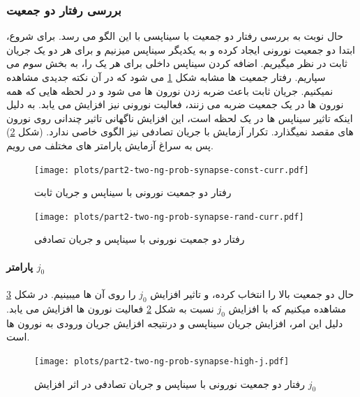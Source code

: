         \subsubsection*{بررسی رفتار دو جمعیت}
            حال نوبت به بررسی رفتار دو جمعیت با سیناپسی با این الگو می رسد. برای شروع، ابتدا دو جمعیت نورونی ایجاد کرده و به یکدیگر سیناپس میزنیم و برای هر دو یک جریان ثابت در نظر میگیریم. اضافه کردن سیناپس داخلی برای هر یک را، به بخش سوم می سپاریم. رفتار جمعیت ها مشابه شکل 
            \ref{fig:part2-two-ng-prob-synapse-const-curr}
            می شود که در آن نکته جدیدی مشاهده نمیکنیم. جریان ثابت باعث ضربه زدن نورون ها می شود و در لحظه هایی که همه نورون ها در یک جمعیت ضربه می زنند، فعالیت نورونی نیز افزایش می یابد. به دلیل اینکه تاثیر سیناپس ها در یک لحظه است، این افزایش ناگهانی تاثیر چندانی روی نورون های مقصد نمیگذارد. تکرار آزمایش با جریان تصادفی نیز الگوی خاصی ندارد.
            (شکل \ref{fig:part2-two-ng-prob-synapse-rand-curr})
            پس به سراغ آزمایش پارامتر های مختلف می رویم.
            \begin{figure}[!ht]
                \centering
                \texttt{[image: plots/part2-two-ng-prob-synapse-const-curr.pdf]} 
                \caption{رفتار دو جمعیت نورونی با سیناپس و جریان ثابت}
                \label{fig:part2-two-ng-prob-synapse-const-curr}
            \end{figure}
            \begin{figure}[!ht]
                \centering
                \texttt{[image: plots/part2-two-ng-prob-synapse-rand-curr.pdf]} 
                \caption{رفتار دو جمعیت نورونی با سیناپس و جریان تصادفی}
                \label{fig:part2-two-ng-prob-synapse-rand-curr}
            \end{figure}

            \paragraph*{پارامتر $j_0$}
                حال دو جمعیت بالا را انتخاب کرده، و تاثیر افزایش 
                $j_0$ 
                را روی آن ها میبینیم. در شکل 
                \ref{fig:part2-two-ng-prob-synapse-high-j}
                مشاهده میکنیم که با افزایش
                $j_0$ 
                نسبت به شکل 
                \ref{fig:part2-two-ng-prob-synapse-rand-curr}
                فعالیت نورون ها افزایش می یابد. دلیل این امر، افزایش جریان سیناپسی و درنتیجه افزایش جریان ورودی به نورون ها است.
                \begin{figure}[!ht]
                    \centering
                    \texttt{[image: plots/part2-two-ng-prob-synapse-high-j.pdf]} 
                    \caption{رفتار دو جمعیت نورونی با سیناپس و جریان تصادفی در اثر افزایش $j_0$}
                    \label{fig:part2-two-ng-prob-synapse-high-j}
                \end{figure}

